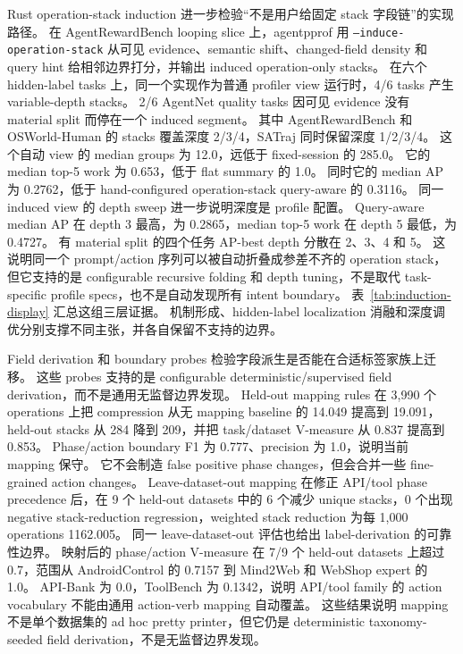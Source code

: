\documentclass[10pt,twocolumn]{ctexart}
\newcommand{\toolname}{agentpprof}
\begin{document}
Rust operation-stack induction 进一步检验“不是用户给固定 stack 字段链”的实现路径。
在 AgentRewardBench looping slice 上，\toolname{} 用 \texttt{--induce-operation-stack} 从可见 evidence、semantic shift、changed-field density 和 query hint 给相邻边界打分，并输出 induced operation-only stacks。
在六个 hidden-label tasks 上，同一个实现作为普通 profiler view 运行时，4/6 tasks 产生 variable-depth stacks。
2/6 AgentNet quality tasks 因可见 evidence 没有 material split 而停在一个 induced segment。
其中 AgentRewardBench 和 OSWorld-Human 的 stacks 覆盖深度 2/3/4，SATraj 同时保留深度 1/2/3/4。
这个自动 view 的 median groups 为 12.0，远低于 fixed-session 的 285.0。
它的 median top-5 work 为 0.653，低于 flat summary 的 1.0。
同时它的 median AP 为 0.2762，低于 hand-configured operation-stack query-aware 的 0.3116。
同一 induced view 的 depth sweep 进一步说明深度是 profile 配置。
Query-aware median AP 在 depth 3 最高，为 0.2865，median top-5 work 在 depth 5 最低，为 0.4727。
有 material split 的四个任务 AP-best depth 分散在 2、3、4 和 5。
这说明同一个 prompt/action 序列可以被自动折叠成参差不齐的 operation stack，但它支持的是 configurable recursive folding 和 depth tuning，不是取代 task-specific profile specs，也不是自动发现所有 intent boundary。
表~\ref{tab:induction-display} 汇总这组三层证据。
机制形成、hidden-label localization 消融和深度调优分别支撑不同主张，并各自保留不支持的边界。



Field derivation 和 boundary probes 检验字段派生是否能在合适标签家族上迁移。
这些 probes 支持的是 configurable deterministic/supervised field derivation，而不是通用无监督边界发现。
Held-out mapping rules 在 3,990 个 operations 上把 compression 从无 mapping baseline 的 14.049 提高到 19.091，held-out stacks 从 284 降到 209，并把 task/dataset V-measure 从 0.837 提高到 0.853。
Phase/action boundary F1 为 0.777、precision 为 1.0，说明当前 mapping 保守。
它不会制造 false positive phase changes，但会合并一些 fine-grained action changes。
Leave-dataset-out mapping 在修正 API/tool phase precedence 后，在 9 个 held-out datasets 中的 6 个减少 unique stacks，0 个出现 negative stack-reduction regression，weighted stack reduction 为每 1,000 operations 1162.005。
同一 leave-dataset-out 评估也给出 label-derivation 的可靠性边界。
映射后的 phase/action V-measure 在 7/9 个 held-out datasets 上超过 0.7，范围从 AndroidControl 的 0.7157 到 Mind2Web 和 WebShop expert 的 1.0。
API-Bank 为 0.0，ToolBench 为 0.1342，说明 API/tool family 的 action vocabulary 不能由通用 action-verb mapping 自动覆盖。
这些结果说明 mapping 不是单个数据集的 ad hoc pretty printer，但它仍是 deterministic taxonomy-seeded field derivation，不是无监督边界发现。
\end{document}
